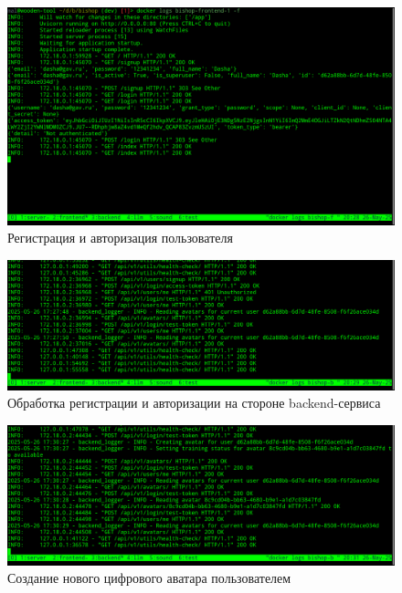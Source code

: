 \begin{figure}
    \centering
    \includegraphics[width=1.0\linewidth]{images/results/signup-login-frontend.png}
    \caption{Регистрация и авторизация пользователя}
    \label{fig:res-signup-login-frontend}
\end{figure}

\begin{figure}
    \centering
    \includegraphics[width=1.0\linewidth]{images/results/signup-login-backend.png}
    \caption{Обработка регистрации и авторизации на стороне backend-сервиса}
    \label{fig:res-signup-login-backend}
\end{figure}

\begin{figure}
    \centering
    \includegraphics[width=1.0\linewidth]{images/results/bk-create-avatar.png}
    \caption{Создание нового цифрового аватара пользователем}
    \label{fig:res-bk-create-avatar}
\end{figure}

